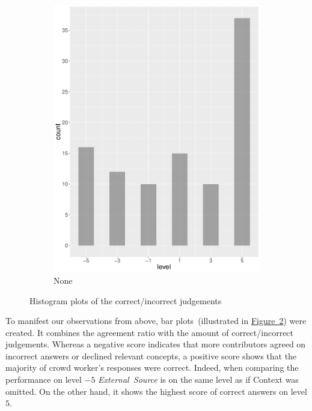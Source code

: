 \begin{figure}
\begin{subfigure}[b]{0.4\textwidth}
        \includegraphics[width=\textwidth]{plots/climate_change/hist_level_none}
        \caption{None}
        \label{fig:hist_level_climate_change_none}
    \end{subfigure}
    \caption{Histogram plots of the correct/incorrect judgements}\label{fig:hist_level_climate_change_all}
\end{figure}

To manifest our observations from above, bar plots~(illustrated in \hyperref[fig:hist_level_climate_change_all]{Figure~\ref*{fig:hist_level_climate_change_all}}) were created. It combines the agreement ratio with the amount of correct/incorrect judgements. Whereas a negative score indicates that more contributors agreed on incorrect answers or declined relevant concepts, a positive score shows that the majority of crowd worker's responses were correct. Indeed, when comparing the performance on level $-5$ \emph{External~Source} is on the same level as if Context was omitted. On the other hand, it shows the highest score of correct answers on level $5$.

